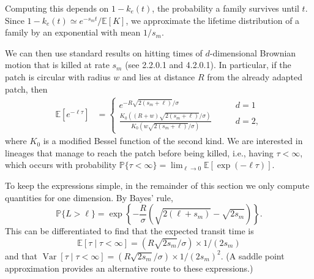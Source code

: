 \documentclass{article}
\newcommand{\linelabel}[1]{}
\newcommand{\revpoint}[2]{}
\newcommand{\citet}[1]{\cite{#1}}
\DeclareMathOperator{\var}{Var}
\renewcommand{\P}{\mathbb{P}}
\newcommand{\E}{\mathbb{E}}
\newcommand{\given}{\mid}
\begin{document}
Computing this depends on $1-k_e(t)$, 
the probability a family survives until $t$.
Since $1-k_e(t) \simeq e^{-s_m t} / \E[K]$,
we approximate the lifetime distribution of a family by an exponential with mean $1/s_m$.
\linelabel{rr:EK}
We can then use standard results on hitting times of $d$-dimensional Brownian motion
that is killed at rate $s_m$ (see \citet{borodin2002handbook} 2.2.0.1 and 4.2.0.1).
In particular, if the patch is circular with radius $w$ and lies at distance
$R$ from the already adapted patch, then 
\begin{align}
  \E[e^{-\ell \tau}] &=
    \begin{cases}
      e^{- R \sqrt{2(s_m+\ell)}/\sigma} \qquad & d=1 \\
      \frac{ K_0( (R+w)\sqrt{2(s_m+\ell)}/\sigma) }{ K_0( w\sqrt{2(s_m+\ell)}/\sigma) } \qquad & d=2  ,
    \end{cases} \label{eqn:borodinresult}
\end{align}
where $K_0$ is a modified Bessel function of the second kind.
We are interested in lineages that manage to reach the patch before being killed,
i.e., having $\tau < \infty$,
which occurs with probability
$\P\{\tau < \infty\} = \lim_{\ell \to 0} \E \left[\exp(-\ell \tau) \right]$. 

To keep the expressions simple, in the remainder of this section we only compute quantities for one dimension.
By Bayes' rule, 
\begin{equation} \label{eqn:haplen_cdf}
    \P\{ L > \ell \}
    = 
    \exp\left\{{-\frac{R}{\sigma}\left(\sqrt{2(\ell+s_m)} - \sqrt{2s_m}\right)}\right\} .
\end{equation}
This can be differentiated to find that the expected transit time is
\begin{equation} 
  \E[\tau \given \tau<\infty ] = (R\sqrt{2s_m}/\sigma)\times 1/(2s_m) \label{eqn:mean_tau}
\end{equation}
and that $\var[\tau \given \tau<\infty ] = (R\sqrt{2s_m}/\sigma) \times 1/(2s_m)^2$.
(A saddle point approximation provides an alternative route to these expressions.) \revpoint{1}{4}

\end{document}
